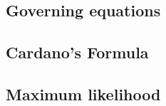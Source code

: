 \documentclass[a4paper,fleqn]{cas-dc}
\begin{document}
\subsection{Governing equations}


\subsection{Cardano's Formula} \label{CH: Cardano}


%

\subsection{Maximum likelihood} \label{CH: ML}






%
\end{document}
